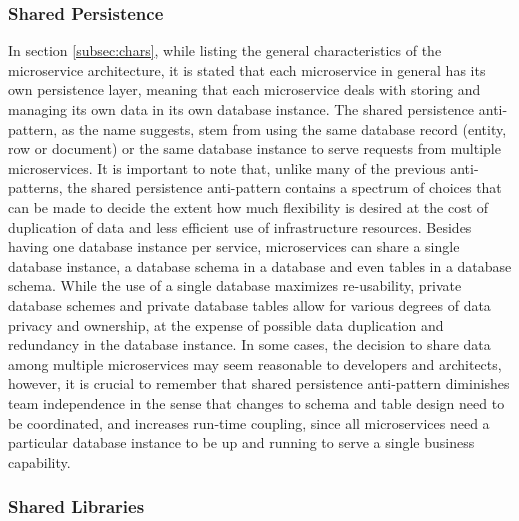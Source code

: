 \documentclass{Configuration_Files/PoliMi3i_thesis}
\begin{document}
\subsubsection{Shared Persistence}
\label{subsubsec:shared_persistence}

In section \ref{subsec:chars}, while listing the general characteristics of the microservice architecture, it is stated that each microservice in general has its own persistence layer, meaning that each microservice deals with storing and managing its own data in its own database instance.
The shared persistence anti-pattern, as the name suggests, stem from using the same database record (entity, row or document) or the same database instance to serve requests from multiple microservices.
It is important to note that, unlike many of the previous anti-patterns, the shared persistence anti-pattern contains a spectrum of choices that can be made to decide the extent how much flexibility is desired at the cost of duplication of data and less efficient use of infrastructure resources.
Besides having one database instance per service, microservices can share a single database instance, a database schema in a database and even tables in a database schema.
While the use of a single database maximizes re-usability, private database schemes and private database tables allow for various degrees of data privacy and ownership, at the expense of possible data duplication and redundancy in the database instance.
In some cases, the decision to share data among multiple microservices may seem reasonable to developers and architects, however, it is crucial to remember that shared persistence anti-pattern diminishes team independence in the sense that changes to schema and table design need to be coordinated, and increases run-time coupling, since all microservices need a particular database instance to be up and running to serve a single business capability.

\subsubsection{Shared Libraries}
\label{subsubsec:shared_libraries}
\end{document}
